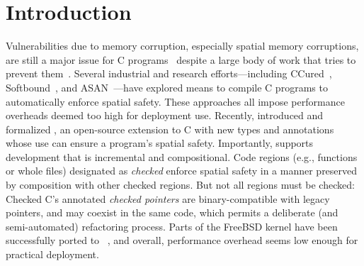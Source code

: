 \section{Introduction}

Vulnerabilities due to memory corruption, especially spatial memory corruptions, 
are still a major issue for C programs~\cite{cvetrend, microsoftmemsafe, Zeng:2013:SRF:2534766.2534798} 
despite a large body of work that tries to prevent them~\cite{song2019sanitizing}.
Several industrial and research efforts---including CCured~\cite{Necula2005},
Softbound~\cite{softbound}, and ASAN~\cite{Serebryany2012}---have
explored means to compile C programs 
to automatically enforce spatial safety. These
approaches all impose performance overheads deemed too high for
deployment use. 
Recently, \citet{Elliott2018,li22checkedc} introduced and formalized \checkedc, an
open-source extension to C with new types and
annotations whose use can ensure a program’s spatial safety.
Importantly, \checkedc supports development that is 
incremental and compositional. Code regions (e.g.,
functions or whole files) designated as \emph{checked} enforce
spatial safety in a manner preserved by composition with
other checked regions. But not all regions must be checked: Checked
C's annotated \emph{checked pointers} are binary-compatible with legacy pointers, and
may coexist in the same code, which permits a deliberate (and
semi-automated) refactoring process. Parts of the FreeBSD kernel have
been successfully ported to \checkedc~\cite{duanrefactoring}, and overall, performance
overhead seems low enough for practical deployment.


